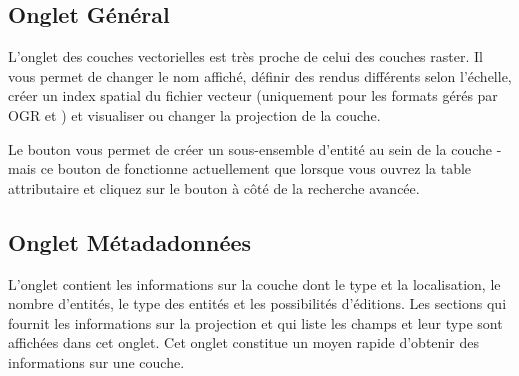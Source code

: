 \subsection{Onglet Général}\label{vectorgeneraltab}
L'onglet  des couches vectorielles est très proche de celui des couches raster. Il vous permet de changer le nom affiché, définir des rendus différents selon l'échelle, créer un index spatial du fichier vecteur (uniquement pour les formats gérés par OGR et \pg) et visualiser ou changer la projection de la couche.

Le bouton  vous permet de créer un sous-ensemble d'entité au sein de la couche - mais ce bouton de fonctionne actuellement que lorsque vous ouvrez la table attributaire et cliquez sur le bouton \button{\dots} à côté de la recherche avancée.

\subsection{Onglet Métadadonnées}

L'onglet  contient les informations sur la couche dont le type et la localisation, le nombre d'entités, le type des entités et les possibilités d'éditions. Les sections  qui fournit les informations sur la projection et  qui liste les champs et leur type sont affichées dans cet onglet. Cet onglet constitue un moyen rapide d'obtenir des informations sur une couche.

